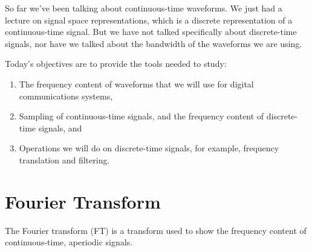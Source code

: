 




So far we've been talking about continuous-time waveforms.  We just had a lecture on signal space representations, which is a discrete representation of a continuous-time signal.  But we have not talked specifically about discrete-time signals, nor have we talked about the bandwidth of the waveforms we are using.

Today's objectives are to provide the tools needed to study:
\begin{enumerate}
 \item The frequency content of waveforms that we will use for digital communications systems,
 \item Sampling of continuous-time signals, and the frequency content of discrete-time signals, and
 \item Operations we will do on discrete-time signals, for example, frequency translation and filtering.
\end{enumerate}

\section{Fourier Transform}

The Fourier transform (FT) is a transform used to show the frequency content of continuous-time, aperiodic signals.

